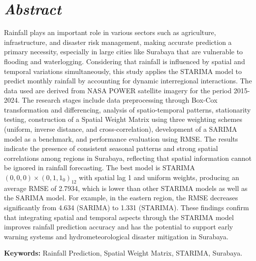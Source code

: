 \chapter*{\textit{Abstract}}
Rainfall plays an important role in various sectors such as agriculture, infrastructure, and disaster risk management, making accurate prediction a primary necessity, especially in large cities like Surabaya that are vulnerable to flooding and waterlogging. 
Considering that rainfall is influenced by spatial and temporal variations simultaneously, this study applies the STARIMA model to predict monthly rainfall by accounting for dynamic interregional interactions. 
The data used are derived from NASA POWER satellite imagery for the period 2015-2024.
The research stages include data preprocessing through Box-Cox transformation and differencing, analysis of spatio-temporal patterns, stationarity testing, construction of a Spatial Weight Matrix using three weighting schemes (uniform, inverse distance, and cross-correlation), development of a SARIMA model as a benchmark, and performance evaluation using RMSE.
The results indicate the presence of consistent seasonal patterns and strong spatial correlations among regions in Surabaya, reflecting that spatial information cannot be ignored in rainfall forecasting. 
The best model is STARIMA$(0, 0, 0) × (0, 1, 1_{0})_{12}$ with spatial lag 1 and uniform weights, producing an average RMSE of 2.7934, which is lower than other STARIMA models as well as the SARIMA model. 
For example, in the eastern region, the RMSE decreases significantly from 4.634 (SARIMA) to 1.331 (STARIMA). 
These findings confirm that integrating spatial and temporal aspects through the STARIMA model improves rainfall prediction accuracy and has the potential to support early warning systems and hydrometeorological disaster mitigation in Surabaya.
\vspace{0.5 cm}
\begin{flushleft}
{\textbf{Keywords:} Rainfall Prediction,  Spatial Weight Matrix, STARIMA, Surabaya.}
\end{flushleft}
